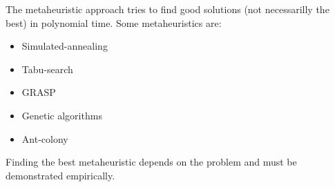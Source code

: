 \documentclass[a4paper,11pt]{article}
\begin{document}
\bigskip

The metaheuristic approach tries to find good solutions (not 
necessarilly the best) in polynomial time. Some metaheuristics are:

\begin{itemize}
	\item Simulated-annealing
	\item Tabu-search
	\item GRASP
	\item Genetic algorithms
	\item Ant-colony
\end{itemize}

Finding the best metaheuristic depends on the problem and must be 
demonstrated empirically.
\end{document}
